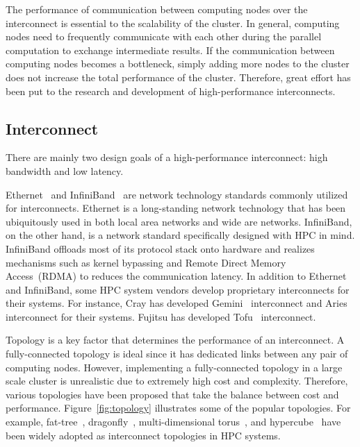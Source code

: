 The performance of communication between computing nodes over the interconnect
is essential to the scalability of the cluster. In general, computing nodes
need to frequently communicate with each other during the parallel computation
to exchange intermediate results. If the communication between computing nodes
becomes a bottleneck, simply adding more nodes to the cluster does not
increase the total performance of the cluster. Therefore, great effort has
been put to the research and development of high-performance interconnects.

\subsection{Interconnect}\label{sec:i-interconnect}

There are mainly two design goals of a high-performance interconnect: high
bandwidth and low latency.

Ethernet~\autocite{Trowbridge2007} and InfiniBand~\autocite{Buyya2009} are
network technology standards commonly utilized for interconnects. Ethernet is
a long-standing network technology that has been ubiquitously used in both
local area networks and wide are networks. InfiniBand, on the other hand, is a
network standard specifically designed with HPC in mind. InfiniBand offloads
most of its protocol stack onto hardware and realizes mechanisms such as
kernel bypassing and Remote Direct Memory Access~(RDMA) to reduces the
communication latency. In addition to Ethernet and InfiniBand, some HPC system
vendors develop proprietary interconnects for their systems. For instance,
Cray has developed Gemini~\autocite{Alverson2010} interconnect and
Aries~\autocite{Faanes2012} interconnect for their systems. Fujitsu has
developed Tofu~\autocite{Ajima2012} interconnect.

Topology is a key factor that determines the performance of an interconnect.
A fully-connected topology is ideal since it has dedicated links between any
pair of computing nodes. However, implementing a fully-connected topology in a
large scale cluster is unrealistic due to extremely high cost and complexity.
Therefore, various topologies have been proposed that take the balance
between cost and performance. Figure~\ref{fig:topology} illustrates some of
the popular topologies. For example, fat-tree~\autocite{Leiserson1985},
dragonfly~\autocite{Kim2008}, multi-dimensional
torus~\autocite{Alverson2010,Ajima2012}, and hypercube~\autocite{Dally2003} have
been widely adopted as interconnect topologies in HPC systems.

